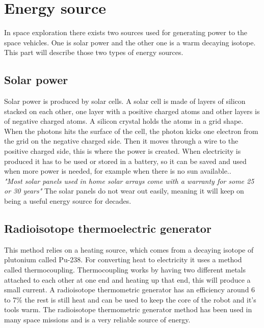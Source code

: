 \section{Energy source}

In space exploration there exists two sources used for generating power to the space vehicles. One is solar power and the other one is a warm decaying isotope. \newline This part will describe those two types of energy sources.

\subsection{Solar power}

Solar power is produced by solar cells. A solar cell is made of layers of silicon stacked on each other, one layer with a positive charged atoms and other layers is of negative charged atoms. A silicon crystal holds the atoms in a grid shape. When the photons hits the surface of the cell, the photon kicks one electron from the grid on the negative charged side. Then it moves through a wire to the positive charged side, this is where the power is created. When electricity is produced it has to be used or stored in a battery, so it can be saved and used when more power is needed, for example when there is no sun available.\cite{SolarPanels}.\\

\textit{"Most solar panels used in home solar arrays come with a warranty for some 25 or 30 years"}\cite{SolarPanels}
The solar panels do not wear out easily, meaning it will keep on being a useful energy source for decades.




\subsection{Radioisotope thermoelectric generator}

This method relies on a heating source, which comes from a decaying isotope of plutonium called Pu-238. For converting heat to electricity it uses a method called thermocoupling. Thermocoupling works by having two different metals attached to each other at one end and heating up that end, this will produce a small current.
A radioisotope thermometric generator has an efficiency around 6 to 7\% the rest is still heat and can be used to keep the core of the robot and it's tools warm. The radioisotope thermometric generator method has been used in many space missions and is a very reliable source of energy\cite{RTG}.



